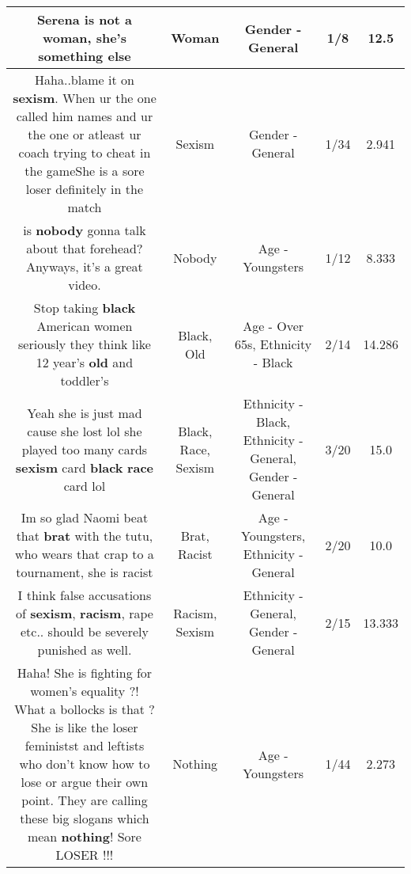 \documentclass[11pt]{article}
\newlength\mylength
\begin{document}
\begin{center}
\begin{longtable}{|C{.65\mylength}|C{.30\mylength}|C{.12\mylength}|C{.12\mylength}|C{.12\mylength}|}
  \small Serena is not a \textbf{woman}, she's something else\normalsize   & Woman & Gender - General & 1/8 & 12.5 \\  \hline
  \small Haha..blame it on \textbf{sexism}. When ur the one called him names and ur the one or atleast ur coach trying to cheat in the gameShe is a sore loser definitely in the match\normalsize   & Sexism & Gender - General & 1/34 & 2.941 \\  \hline
  \small is \textbf{nobody} gonna talk about that forehead? Anyways, it's a great video.\normalsize   & Nobody & Age - Youngsters & 1/12 & 8.333 \\  \hline
  \small Stop taking \textbf{black} American women seriously they think like 12 year's \textbf{old} and toddler's\normalsize   & Black, Old & Age - Over 65s, Ethnicity - Black & 2/14 & 14.286 \\  \hline
  \small Yeah she is just mad cause she lost lol she played too many cards \textbf{sexism} card \textbf{black} \textbf{race} card lol\normalsize   & Black, Race, Sexism & Ethnicity - Black, Ethnicity - General, Gender - General & 3/20 & 15.0 \\  \hline
  \small Im so glad Naomi beat that \textbf{brat} with the tutu, who wears that crap to a tournament, she is racist\normalsize   & Brat, Racist & Age - Youngsters, Ethnicity - General & 2/20 & 10.0 \\  \hline
  \small I think false accusations of \textbf{sexism}, \textbf{racism}, rape etc.. should be severely punished as well.\normalsize   & Racism, Sexism & Ethnicity - General, Gender - General & 2/15 & 13.333 \\  \hline
  \small Haha! She is fighting for women's equality ?! What a bollocks is that ?She is like the loser feministst and leftists who don't know how to lose or argue their own point. They are calling these big slogans which mean \textbf{nothing}! Sore LOSER !!!\normalsize   & Nothing & Age - Youngsters & 1/44 & 2.273 \\  \hline

\end{longtable}
\end{center}
\end{document}

